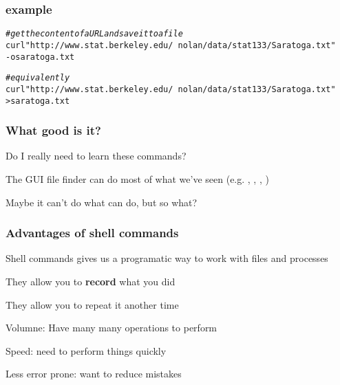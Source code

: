 \documentclass[12pt]{beamer}\usepackage[]{graphicx}\usepackage[]{color}
\makeatletter
\newcommand{\hlstr}[1]{\textcolor[rgb]{0.192,0.494,0.8}{#1}}%
\newcommand{\hlcom}[1]{\textcolor[rgb]{0.678,0.584,0.686}{\textit{#1}}}%
\newenvironment{kframe}{%
 \def\at@end@of@kframe{}%
 \ifinner\ifhmode%
  \def\at@end@of@kframe{\end{minipage}}%
  \begin{minipage}{\columnwidth}%
 \fi\fi%
 \def\FrameCommand##1{\hskip\@totalleftmargin \hskip-\fboxsep
 \colorbox{shadecolor}{##1}\hskip-\fboxsep
     \hskip-\linewidth \hskip-\@totalleftmargin \hskip\columnwidth}%
 \MakeFramed {\advance\hsize-\width
   \@totalleftmargin\z@ \linewidth\hsize
   \@setminipage}}%
 {\par\unskip\endMakeFramed%
 \at@end@of@kframe}
\newenvironment{knitrout}{}{} %
\makeatother
\begin{document}

\begin{frame}[fragile]
\frametitle{ example}

\begin{knitrout}\scriptsize
{}\color{fgcolor}\begin{kframe}
\begin{alltt}
\hlcom{# get the content of a URL and save it to a file}
curl \hlstr{"http://www.stat.berkeley.edu/~nolan/data/stat133/Saratoga.txt"} 
-o saratoga.txt


\hlcom{# equivalently}
curl \hlstr{"http://www.stat.berkeley.edu/~nolan/data/stat133/Saratoga.txt"} 
> saratoga.txt
\end{alltt}
\end{kframe}
\end{knitrout}

\end{frame}


\begin{frame}
\begin{center}
\Huge{}
\end{center}
\end{frame}


\begin{frame}
\frametitle{What good is it?}

\bbi
  \item Do I really need to learn these commands?
  \item The GUI file finder can do most of what we've seen (e.g. , , , )
  \item Maybe it can't do what  can do, but so what?
\ei

\end{frame}


\begin{frame}
\frametitle{Advantages of shell commands}

\bbi
  \item Shell commands gives us a programatic way to work with files and processes
  \item They allow you to \textbf{record} what you did
  \item They allow you to repeat it another time
  \item Volumne: Have many many operations to perform
  \item Speed: need to perform things quickly
  \item Less error prone: want to reduce mistakes
\ei

\end{frame}
\end{document}
